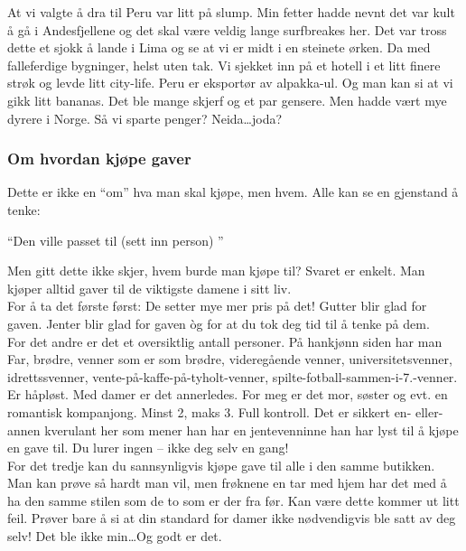 At vi valgte å dra til Peru var litt på slump. Min fetter hadde nevnt
det var kult å gå i Andesfjellene og det skal være veldig lange
surfbreakes her. Det var tross dette et sjokk å lande i Lima og se at
vi er midt i en steinete ørken. Da med falleferdige bygninger, helst
uten tak. Vi sjekket inn på et hotell i et litt finere strøk og levde
litt city-life. Peru er eksportør av alpakka-ul. Og man kan si at vi
gikk litt bananas. Det ble mange skjerf og et par gensere. Men hadde
vært mye dyrere i Norge. Så vi sparte penger? Neida\ldots joda?
\clearpage

\subsubsection{Om hvordan kjøpe gaver}
Dette er ikke en ``om'' hva man skal kjøpe, men hvem. Alle
kan se en gjenstand å tenke:

\begin{dialogue}
	\item ``Den ville passet til (sett inn person) ''
\end{dialogue}

Men gitt dette ikke skjer, hvem burde man kjøpe til? Svaret er
enkelt. Man kjøper alltid gaver til de viktigste damene i sitt liv.\\

For å ta det første først: De setter mye mer pris på det! Gutter blir
glad for gaven. Jenter blir glad for gaven òg for at du tok deg tid
til å tenke på dem.\\

For det andre er det et oversiktlig antall personer. På hankjønn
siden har man Far, brødre, venner som er som brødre, videregående
venner, universitetsvenner, idrettssvenner, 
vente-på-kaffe-på-tyholt-venner, spilte-fotball-sammen-i-7.-venner. Er
håpløst. Med damer er det
annerledes. For meg er det mor, søster og evt. en romantisk
kompanjong. Minst 2, maks 3. Full kontroll. Det er sikkert en-
eller-annen kverulant her som mener han har en jentevenninne han har lyst
til å kjøpe en gave til. Du lurer ingen -- ikke deg selv en gang!\\

For det tredje kan du sannsynligvis kjøpe gave til alle i den samme
butikken. Man kan prøve så hardt man vil, men frøknene en tar med hjem
har det med å ha den samme stilen som de to som er der fra før. Kan
være dette kommer ut litt feil. Prøver bare å si at din standard for
damer
ikke nødvendigvis ble satt av deg selv! Det ble ikke min\ldots Og godt er det.\\


